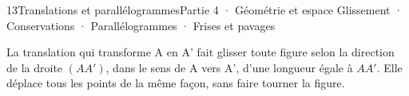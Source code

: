 \begin{ouverture}[translation]{13}{Translations et parallélogrammes}{Partie 4 · Géométrie et espace}
{Glissement · Conservations · Parallélogrammes · Frises et pavages}
\end{ouverture}
\pagestyle{otMain}\essentiel\fontsize{11}{15}\selectfont
{}\label{cours-13-1}
\begin{definition}La translation qui transforme A en A’ fait glisser toute figure selon la direction de la droite $(AA')$, dans le sens de A vers A’, d’une longueur égale à $AA'$. Elle déplace tous les points de la même façon, sans faire tourner la figure.\end{definition}
\label{fig-cours-13-1-cours-translation}

